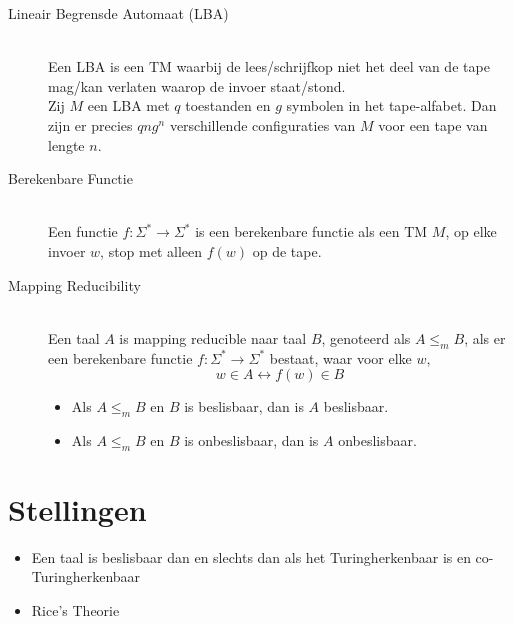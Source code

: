 \documentclass[]{article}
\begin{document}
\begin{itemize}
\begin{description}
	\item[Lineair Begrensde Automaat (LBA)] \hfill \\
	Een LBA is een TM waarbij de lees/schrijfkop niet het deel van de tape mag/kan verlaten waarop de invoer staat/stond.\\
	Zij $M$ een LBA met $q$ toestanden en $g$ symbolen in het tape-alfabet. Dan zijn er precies $qng^n$ verschillende configuraties van $M$ voor een tape van lengte $n$.
	
	\item[Berekenbare Functie] \hfill \\
	Een functie $f: \Sigma^* \rightarrow \Sigma^*$ is een berekenbare functie als een TM $M$, op elke invoer $w$, stop met alleen $f(w)$ op de tape.
	
	\item[Mapping Reducibility] \hfill \\
	Een taal $A$ is mapping reducible naar taal $B$, genoteerd als $A \leq_m B$, als er een berekenbare functie $f: \Sigma^* \rightarrow \Sigma^*$ bestaat, waar voor elke $w$,
	$$w \in A \longleftrightarrow f(w) \in B$$
	\begin{itemize}
		\item Als $A \leq_m B$ en $B$ is beslisbaar, dan is $A$ beslisbaar.
		\item Als $A \leq_m B$ en $B$ is onbeslisbaar, dan is $A$ onbeslisbaar.
	\end{itemize}
\end{description}
\end{itemize}

\section*{Stellingen}
\begin{itemize}
	\item Een taal is beslisbaar dan en slechts dan als het Turingherkenbaar is en co-Turingherkenbaar
	
	\item Rice's Theorie
\end{itemize}
\end{document}
